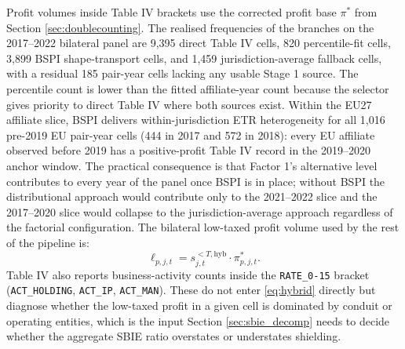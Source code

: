 \documentclass[11pt,a4paper]{article}
\newcommand{\code}[1]{\texttt{#1}}
\begin{document}
Profit volumes inside Table IV brackets use the corrected profit base $\pi^{*}$ from Section \ref{sec:doublecounting}. The realised frequencies of the branches on the 2017--2022 bilateral panel are 9{,}395 direct Table IV cells, 820 percentile-fit cells, 3{,}899 BSPI shape-transport cells, and 1{,}459 jurisdiction-average fallback cells, with a residual 185 pair-year cells lacking any usable Stage 1 source. The percentile count is lower than the fitted affiliate-year count because the selector gives priority to direct Table IV where both sources exist. Within the EU27 affiliate slice, BSPI delivers within-jurisdiction ETR heterogeneity for all 1{,}016 pre-2019 EU pair-year cells (444 in 2017 and 572 in 2018): every EU affiliate observed before 2019 has a positive-profit Table IV record in the 2019--2020 anchor window. The practical consequence is that Factor 1's alternative level contributes to every year of the panel once BSPI is in place; without BSPI the distributional approach would contribute only to the 2021--2022 slice and the 2017--2020 slice would collapse to the jurisdiction-average approach regardless of the factorial configuration. The bilateral low-taxed profit volume used by the rest of the pipeline is:
\begin{equation}\label{eq:lowtax_profit}
\ell_{p,j,t} = s_{j,t}^{<T,\text{hyb}} \cdot \pi_{p,j,t}^{*}.
\end{equation}
Table IV also reports business-activity counts inside the \code{RATE\_0-15} bracket (\code{ACT\_HOLDING}, \code{ACT\_IP}, \code{ACT\_MAN}). These do not enter \eqref{eq:hybrid} directly but diagnose whether the low-taxed profit in a given cell is dominated by conduit or operating entities, which is the input Section \ref{sec:sbie_decomp} needs to decide whether the aggregate SBIE ratio overstates or understates shielding.
\end{document}
